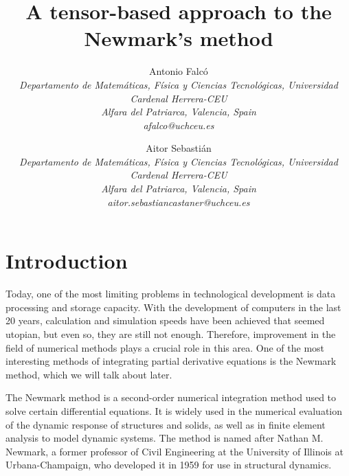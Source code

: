 \documentclass[a4paper, 10pt]{article}
\title{\textbf{A tensor-based approach to the Newmark's method}}
\author{Antonio Falcó \\
\small \textit{Departamento de Matemáticas, Física y Ciencias Tecnológicas, Universidad Cardenal Herrera-CEU}\\
\small \textit{Alfara del Patriarca, Valencia, Spain}\\
\small \textit{afalco@uchceu.es}\\
\date{}
\and
Aitor Sebastián\\
\small \textit{Departamento de Matemáticas, Física y Ciencias Tecnológicas, Universidad Cardenal Herrera-CEU}\\
\small \textit{Alfara del Patriarca, Valencia, Spain}\\
\small \textit{aitor.sebastiancastaner@uchceu.es}\\}
\begin{document}
\maketitle

\begin{abstract}

\end{abstract}



\section{Introduction}



Today, one of the most limiting problems in technological development is data processing and storage capacity. With the development of computers in the last 20 years, calculation and simulation speeds have been achieved that seemed utopian, but even so, they are still not enough. Therefore, improvement in the field of numerical methods plays a crucial role in this area. One of the most interesting methods of integrating partial derivative equations is the Newmark method, which we will talk about later.


The Newmark method is a second-order numerical integration method used to solve certain differential equations. It is widely used in the numerical evaluation of the dynamic response of structures and solids, as well as in finite element analysis to model dynamic systems. The method is named after Nathan M. Newmark, a former professor of Civil Engineering at the University of Illinois at Urbana-Champaign, who developed it in 1959 for use in structural dynamics.
\end{document}

